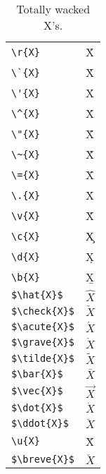 \documentclass{article}
\begin{document}
\begin{table}
\begin{center}
\begin{tabular}{ll}
\verb#\r{X}#& \r{X}\\
\verb#\`{X}#& \`{X}\\
\verb#\'{X}#& \'{X}\\
\verb#\^{X}#& \^{X}\\
\verb#\"{X}#& \"{X}\\
\verb#\~{X}#& \~{X}\\
\verb#\={X}#& \={X}\\
\verb#\.{X}#& \.{X}\\
\verb#\v{X}#& \v{X}\\
\verb#\c{X}#& \c{X}\\
\verb#\d{X}#& \d{X}\\
\verb#\b{X}#& \b{X}\\
\verb#$\hat{X}$#& $\hat{X}$\\
\verb#$\check{X}$#& $\check{X}$\\
\verb#$\acute{X}$#& $\acute{X}$\\
\verb#$\grave{X}$#& $\grave{X}$\\
\verb#$\tilde{X}$#& $\tilde{X}$\\
\verb#$\bar{X}$#& $\bar{X}$\\
\verb#$\vec{X}$#& $\vec{X}$\\
\verb#$\dot{X}$#& $\dot{X}$\\
\verb#$\ddot{X}$#& $\ddot{X}$\\
\verb#\u{X}#& \u{X}\\
\verb#$\breve{X}$#& $\breve{X}$
\end{tabular}
\caption{Totally wacked X's.}
\end{center}
\end{table}
\pagebreak
\end{document}
